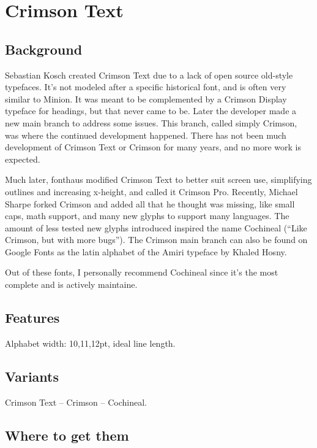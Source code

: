 \switchtobodyfont[crimsontext,10pt]
\chapter{Crimson Text}

\section{Background}
Sebastian Kosch created Crimson Text due to a lack of open source old-style typefaces. It’s not modeled after a specific historical font, and is often very similar to Minion. It was meant to be complemented by a Crimson Display typeface for headings, but that never came to be. Later the developer made a new main branch to address some issues. This branch, called simply Crimson, was where the continued development happened. There has not been much development of Crimson Text or Crimson for many years, and no more work is expected.

Much later, fonthaus modified Crimson Text to better suit screen use, simplifying outlines and increasing x-height, and called it Crimson Pro. Recently, Michael Sharpe forked Crimson and added all that he thought was missing, like small caps, math support, and many new glyphs to support many languages. The amount of less tested new glyphs introduced inspired the name Cochineal (“Like Crimson, but with more bugs”). The Crimson main branch can also be found on Google Fonts as the latin alphabet of the Amiri typeface by Khaled Hosny. 

Out of these fonts, I personally recommend Cochineal since it’s the most complete and is actively maintaine.

\section{Features}

Alphabet width: 10,11,12pt, ideal line length.

\section{Variants}
Crimson Text -- Crimson -- Cochineal.

\section{Where to get them}
